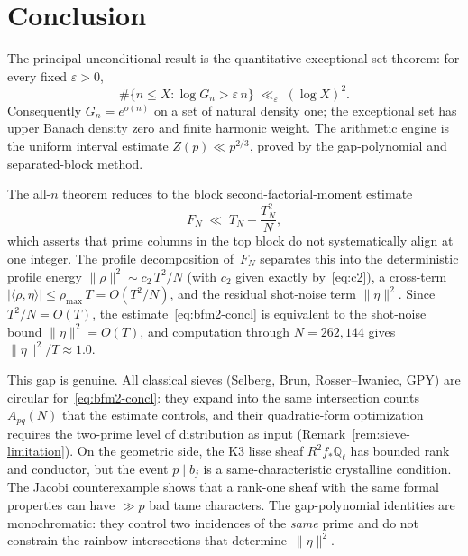 \documentclass[11pt]{article}
\theoremstyle{definition}
\theoremstyle{remark}
\begin{document}


\section{Conclusion}

The principal unconditional result is the quantitative
exceptional-set theorem:
for every fixed $\varepsilon > 0$,
\[
  \#\{n \le X : \log G_n > \varepsilon\, n\}
  \;\ll_\varepsilon\;
  (\log X)^2.
\]
Consequently $G_n = e^{o(n)}$ on a set of natural
density one; the exceptional set has upper Banach
density zero and finite harmonic weight.
The arithmetic engine is the uniform interval
estimate $Z(p) \ll p^{2/3}$, proved by the
gap-polynomial and separated-block method.

The all-$n$ theorem reduces to the block
second-factorial-moment estimate
\begin{equation}\label{eq:bfm2-concl}
  F_N \;\ll\; T_N + \frac{T_N^2}{N},
\end{equation}
which asserts that prime columns in the
top block do not systematically align at
one integer.
The profile decomposition of~$F_N$ separates
this into the deterministic profile energy
$\|\rho\|^2 \sim c_2\,T^2/N$
(with $c_2$ given exactly by~\eqref{eq:c2}),
a cross-term
$|\langle\rho,\eta\rangle|
\le \rho_{\max}\,T = O(T^2/N)$,
and the residual shot-noise term
$\|\eta\|^2$.
Since $T^2/N = O(T)$, the
estimate~\eqref{eq:bfm2-concl} is
equivalent to the shot-noise bound
$\|\eta\|^2 = O(T)$,
and computation through $N = 262{,}144$
gives $\|\eta\|^2/T \approx 1.0$.

This gap is genuine.
All classical sieves (Selberg, Brun,
Rosser--Iwaniec, GPY) are circular
for~\eqref{eq:bfm2-concl}: they expand
into the same intersection counts
$A_{pq}(N)$ that the estimate controls,
and their quadratic-form optimization
requires the two-prime level of
distribution as input
(Remark~\ref{rem:sieve-limitation}).
On the geometric side, the K3 lisse
sheaf $R^2f_*\mathbb{Q}_\ell$
has bounded rank and conductor, but
the event $p \mid b_j$ is a
same-characteristic crystalline condition.
The Jacobi counterexample shows that
a rank-one sheaf with the same formal
properties can have $\gg p$ bad tame
characters.
The gap-polynomial identities are
monochromatic: they control two
incidences of the \emph{same} prime
and do not constrain the rainbow
intersections that determine~$\|\eta\|^2$.
\end{document}
